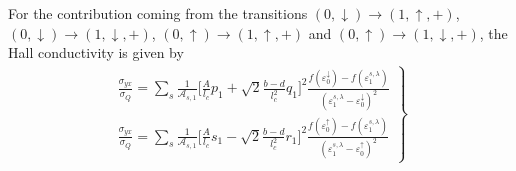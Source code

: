 \documentclass[prb,twocolumn]{revtex4-1}
\begin{document}
For the contribution coming from the transitions $(0,\downarrow)\rightarrow (1,\uparrow,+)$, $(0,\downarrow)\rightarrow (1,\downarrow,+)$, $(0,\uparrow)\rightarrow (1,\uparrow,+)$ and $(0,\uparrow)\rightarrow (1,\downarrow,+)$, the Hall conductivity is given by
\begin{eqnarray}\label{hall_con_form_2}
\left.
\begin{array}{ll}
\frac{\sigma_{yx}}{\sigma_Q}=\sum_s\frac{1}{\mathcal{A}_{s,1}}\Big[\frac{A }{l_c}p_1+\sqrt{2}\frac{b-d}{l_c^2}q_1\Big]^2\frac{f(\varepsilon_{0}^{\downarrow})-f(\varepsilon_{1}^{s,\lambda})}{(\varepsilon_{1}^{s,\lambda}-\varepsilon_{0}^{\downarrow})^2}\\
\frac{\sigma_{yx}}{\sigma_Q}=\sum_s\frac{1}{\mathcal{A}_{s,1}}\Big[\frac{A }{l_c}s_1-\sqrt{2}\frac{b-d}{l_c^2}r_1\Big]^2\frac{f(\varepsilon_{0}^{\uparrow})-f(\varepsilon_{1}^{s,\lambda})}{(\varepsilon_{1}^{s,\lambda}-\varepsilon_{0}^{\uparrow})^2}
\end{array}
\right\}
\end{eqnarray}
\end{document}
